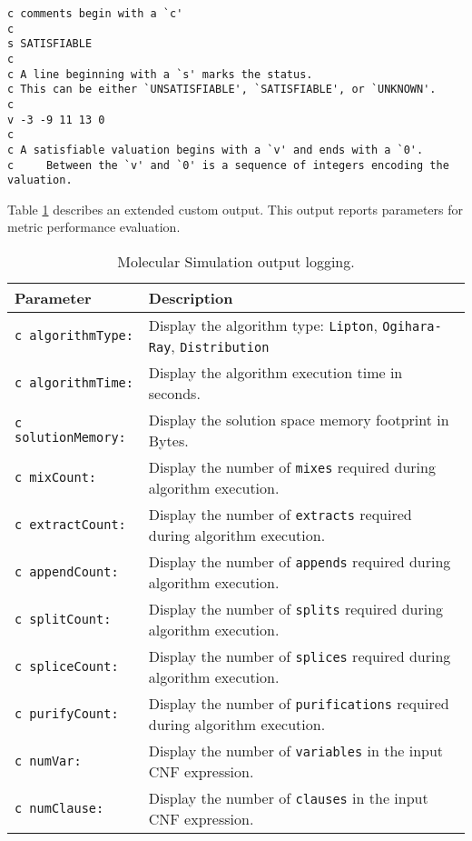 \begin{verbatim}
c comments begin with a `c'
c
s SATISFIABLE
c
c A line beginning with a `s' marks the status.
c This can be either `UNSATISFIABLE', `SATISFIABLE', or `UNKNOWN'.
c
v -3 -9 11 13 0
c
c A satisfiable valuation begins with a `v' and ends with a `0'.
c     Between the `v' and `0' is a sequence of integers encoding the valuation.
\end{verbatim}

Table \ref{outputTableDefiniton} describes an extended custom output.  This output reports parameters for metric performance evaluation.
\begin{table}[htdp]
\caption{Molecular Simulation output logging.}
\begin{center}
\begin{tabular}{| l | l |}
\hline
\textbf{Parameter} & \textbf{Description} \\ \hline	
\texttt{c algorithmType:}&	Display the algorithm type: \texttt{Lipton}, \texttt{Ogihara-Ray}, \texttt{Distribution}\\ 
\texttt{c algorithmTime:}&	Display the algorithm execution time in seconds.\\ 
\texttt{c solutionMemory:}& Display the solution space memory footprint in Bytes.	\\ 
\texttt{c mixCount:}	&	Display the number of \texttt{mixes} required during algorithm execution.\\ 
\texttt{c extractCount:}&	Display the number of \texttt{extracts} required during algorithm execution.\\ 
\texttt{c appendCount:}&	Display the number of \texttt{appends} required during algorithm execution.\\ 
\texttt{c splitCount:}	&	Display the number of \texttt{splits} required during algorithm execution.\\ 
\texttt{c spliceCount:}&	Display the number of \texttt{splices} required during algorithm execution.\\ 
\texttt{c purifyCount:}&	Display the number of \texttt{purifications} required during algorithm execution.\\ 
\texttt{c numVar:}	&	Display the number of \texttt{variables} in the input CNF expression.\\ 
\texttt{c numClause:}	&	Display the number of \texttt{clauses} in the input CNF expression.\\ \hline

\end{tabular}
\end{center}
\label{outputTableDefiniton}
\end{table}%
		

